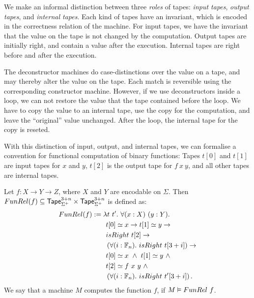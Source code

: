 We make an informal distinction between three \textit{roles} of tapes: \textit{input tapes}, \textit{output tapes}, and \textit{internal tapes}.  Each
kind of tapes have an invariant, which is encoded in the correctness relation of the machine.  For input tapes, we have the invariant that the value
on the tape is not changed by the computation.  Output tapes are initially right, and contain a value after the execution.  Internal tapes are right
before and after the execution.

The deconstructor machines do case-distinctions over the value on a tape, and may thereby alter the value on the tape.  Each match is reversible using
the corresponding constructor machine.  However, if we use deconstructors inside a loop, we can not restore the value that the tape contained before
the loop.  We have to copy the value to an internal tape, use the copy for the computation, and leave the ``original'' value unchanged.  After the
loop, the internal tape for the copy is reseted.


With this distinction of input, output, and internal tapes, we can formalise a convention for functional computation of binary functions: Tapes $t[0]$
and $t[1]$ are input tapes for $x$ and $y$, $t[2]$ is the output tape for $f~x~y$, and all other tapes are internal tapes.
\begin{definition}
  \label{def:Computes2_Rel}
  Let $f : X \to Y \to Z$, where $X$ and $Y$ are encodable on $\Sigma$.  Then
  $FunRel(f) \subseteq \mathsf{Tape}_{\Sigma^+}^{3+n} \times \mathsf{Tape}_{\Sigma^+}^{3+n}$ is defined as:
  \begin{alignat*}{2}
     FunRel(f) &:= \lambda t~t'.~\forall (x:X)~(y:Y). \\
    &\qquad t[0] \simeq x \rightarrow t[1] \simeq y \rightarrow \\
    &\qquad isRight~t[2] \rightarrow \\
    &\qquad \left(\forall (i:\mathbb{F}_n).~isRight~t[3+i] \right) \rightarrow \\
    &\qquad t[0] \simeq x ~\land~ t[1] \simeq y ~\land~ \\
    &\qquad t[2] \simeq f~x~y ~\land~ \\
    &\qquad \left(\forall (i:\mathbb{F}_n).~isRight~t'[3+i] \right).
  \end{alignat*}
  We say that a machine $M$ computes the function $f$, if $M \mathrel{\vDash} FunRel~f$.
\end{definition}

